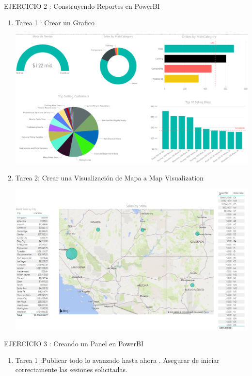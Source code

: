 \begin{itemize}
EJERCICIO 2 : Construyendo Reportes en PowerBI

\begin{enumerate}
\item Tarea 1 : Crear un Grafico

\begin{center}
\includegraphics[scale=0.66]{./Imagenes/ejer2_tarea1.png}
\end{center}

\item Tarea 2: Crear una Visualizaci\'on de Mapa a Map Visualization

\begin{center}
\includegraphics[scale=0.70]{./Imagenes/ejer2_tarea2.png}
\end{center}

\end{enumerate}


EJERCICIO 3 : Creando un Panel en PowerBI
\begin{enumerate}

\item Tarea 1 :Publicar todo lo avanzado hasta ahora . Asegurar de iniciar correctamente las sesiones solicitadas.


\end{enumerate}
\end{itemize}
